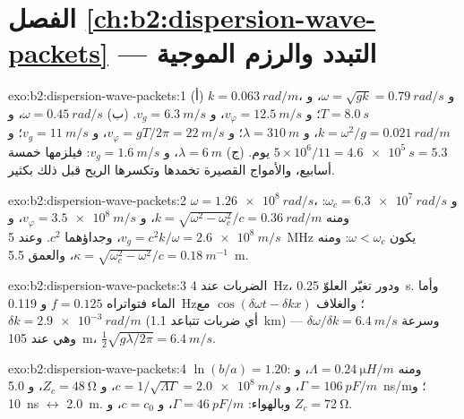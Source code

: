 \section*{الفصل \ref{ch:b2:dispersion-wave-packets} --- التبدد والرزم الموجية}

\begin{solution}{exo:b2:dispersion-wave-packets:1}
(أ) $k = \qty{0.063}{rad/m}$، و $\omega = \sqrt{gk} = \qty{0.79}{rad/s}$، و $T = \qty{8.0}{s}$؛
و $v_\varphi = \qty{12.5}{m/s}$، و $v_g = \qty{6.3}{m/s}$. (ب) $\omega = \qty{0.45}{rad/s}$، و $k = \omega^2
/g = \qty{0.021}{rad/m}$، و $\lambda = \qty{310}{m}$؛ و $v_\varphi = gT/2\pi = \qty{22}{m/s}$، و $v_g =
\qty{11}{m/s}$؛ و $5 \times 10^6/11 = \qty{4.6e5}{s} = 5.3$ يوم. (ج) $\lambda = \qty{6}{m}$، و $v_g
= \qty{1.6}{m/s}$: فيلزمها خمسة أسابيع، والأمواج القصيرة تخمدها
 وتكسرها الريح قبل ذلك بكثير.
\end{solution}

\begin{solution}{exo:b2:dispersion-wave-packets:2}
$\omega = \qty{1.26e8}{rad/s}$، و $\omega_c = \qty{6.3e7}{rad/s}$: ومنه $k = \sqrt{\omega^2 - \omega_c^2}/c =
\qty{0.36}{rad/m}$، و $v_\varphi = \qty{3.5e8}{m/s}$، و $v_g = c^2k/\omega = \qty{2.6e8}{m/s}$،
وجداؤهما $c^2$. وعند \qty{5}{MHz} يكون $\omega < \omega_c$: ومنه $\kappa = \sqrt{\omega_c^2 - \omega^2}/c =
\qty{0.18}{m^{-1}}$، والعمق \qty{5.5}{m}.
\end{solution}

\begin{solution}{exo:b2:dispersion-wave-packets:3}
الضربات عند \qty{4}{Hz}، ودور تغيّر العلوّ \qty{0.25}{s}. وأما الماء فتواتراه $f = 0.125$ و
\qty{0.119}{Hz}؛ والغلاف $\cos(\delta\omega t - \delta kx)$ مع $\delta k = \qty{2.9e-3}{rad/m}$
(أي ضربات تتباعد \qty{1.1}{km}) وسرعة $\delta\omega/\delta k = \qty{6.4}{m/s}$ --- وهي
 عند \qty{105}{m}، $\tfrac12\sqrt{g\lambda/2\pi} = \qty{6.4}{m/s}$.
\end{solution}

\begin{solution}{exo:b2:dispersion-wave-packets:4}
$\ln(b/a) = 1.20$: ومنه $\Lambda = \qty{0.24}{\micro H/m}$، و $\Gamma = \qty{106}{pF/m}$، و $c = 1/
\sqrt{\Lambda\Gamma} = \qty{2.0e8}{m/s}$، و $Z_c = \qty{48}{\ohm}$، و \qty{5.0}{ns/m}؛ و \qty{10}{ns}
$\leftrightarrow$ \qty{2.0}{m}. وبالهواء: $\Gamma = \qty{46}{pF/m}$، و $c = c_0$، و $Z_c = \qty{72}{\ohm}$.
\end{solution}


